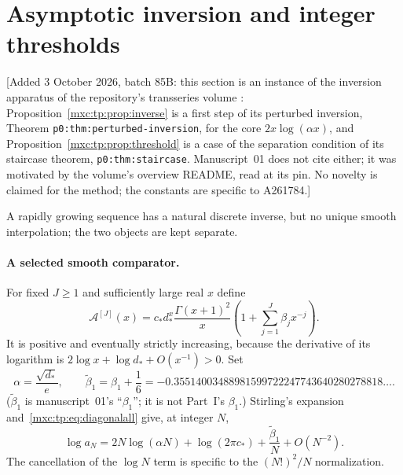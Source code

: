 \documentclass[11pt]{article}
\numberwithin{equation}{section}
\theoremstyle{definition}
\theoremstyle{remark}
\begin{document}
\section{Asymptotic inversion and integer thresholds}\label{mxc:tp:sec:inverse}

[Added 3 October 2026, batch 85B: this section is an instance of the
inversion apparatus of the repository's transseries volume \cite{tsvol}:
Proposition~\ref{mxc:tp:prop:inverse} is a first step of its perturbed
inversion, Theorem \texttt{p0:thm:perturbed-inversion}, for the core
$2x\log(\alpha x)$, and Proposition~\ref{mxc:tp:prop:threshold} is a case
of the separation condition of its staircase theorem,
\texttt{p0:thm:staircase}. Manuscript~01 does not cite either; it was
motivated by the volume's overview README, read at its pin. No novelty is
claimed for the method; the constants are specific to A261784.]

A rapidly growing sequence has a natural discrete inverse, but no unique
smooth interpolation; the two objects are kept separate.

\paragraph{A selected smooth comparator.} For fixed $J\ge1$ and
sufficiently large real $x$ define
\begin{equation}\label{mxc:tp:eq:smoothmodel}
 \mathcal A^{[J]}(x)=c_*d_*^x\frac{\Gamma(x+1)^2}{x}
 \left(1+\sum_{j=1}^{J}\beta_jx^{-j}\right).
\end{equation}
It is positive and eventually strictly increasing, because the derivative
of its logarithm is $2\log x+\log d_*+O(x^{-1})>0$. Set
\begin{equation}\label{mxc:tp:eq:inverseconst}
 \alpha=\frac{\sqrt{d_*}}e,\qquad
 \widetilde\beta_1=\beta_1+\frac16
 =-0.35514003488981599722247743640280278818\ldots.
\end{equation}
($\widetilde\beta_1$ is manuscript~01's ``$\beta_1$''; it is not Part~I's
$\beta_1$.) Stirling's expansion and~\eqref{mxc:tp:eq:diagonalall} give, at
integer $N$,
\begin{equation}\label{mxc:tp:eq:loginverse}
 \log a_N=2N\log(\alpha N)+\log(2\pi c_*)+\frac{\widetilde\beta_1}N+O(N^{-2}).
\end{equation}
The cancellation of the $\log N$ term is specific to the $(N!)^2/N$
normalization.
\end{document}
